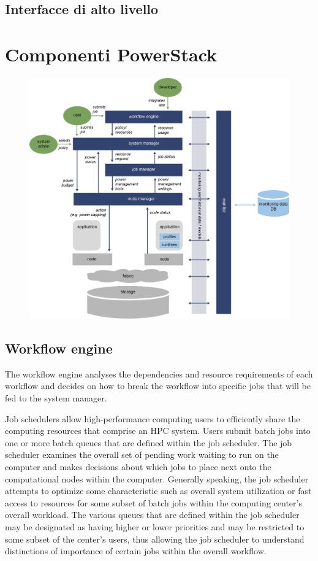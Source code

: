 \subsection{Interfacce di alto livello}

\section{Componenti PowerStack}
\begin{figure}
    \centering
    \includegraphics[width=\textwidth]{img/REGALE-Architecture-1536x1421.png}
\end{figure}
\subsection{Workflow engine}
The workflow engine analyses the dependencies and resource requirements of each workflow and decides on how to break the workflow into specific jobs that will be fed to the system manager. 

Job schedulers allow high-performance computing users to efficiently share the computing resources that comprise an HPC system. Users submit batch jobs into one or more batch queues that are defined within the job scheduler. The job scheduler examines the overall set of pending work waiting to run on the computer and makes decisions about which jobs to place next onto the computational nodes within the computer. Generally speaking, the job scheduler attempts to optimize some characteristic such as overall system utilization or fast access to resources for some subset of batch jobs within the computing center's overall workload. The various queues that are defined within the job scheduler may be designated as having higher or lower priorities and may be restricted to some subset of the center's users, thus allowing the job scheduler to understand distinctions of importance of certain jobs within the overall workflow.



